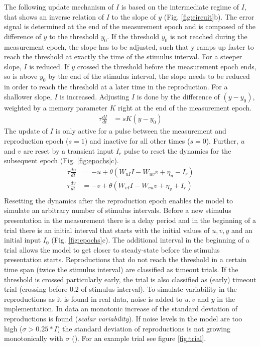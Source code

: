 \documentclass[9pt]{article}
\begin{document}
The following update mechanism of $I$ is based on the intermediate regime of $I$, that shows an inverse relation of $I$ to the slope of $y$ (Fig. \ref{fig:circuit}b).
The error signal is determined at the end of the measurement epoch and is composed of the difference of $y$ to the threshold $y_0$.
If the threshold $y_0$ is not reached during the measurement epoch, the slope has to be adjusted, such that y ramps up faster to reach the threshold at exactly the time of the stimulus interval. For a steeper slope, $I$ is reduced.
If $y$ crossed the threshold before the measurement epoch ends, so is above $y_0$ by the end of the stimulus interval, the slope needs to be reduced in order to reach the threshold at a later time in the reproduction. For a shallower slope, $I$ is increased.
Adjusting $I$ is done by the difference of $(y-y_0)$, weighted by a memory parameter $K$ right at the end of the measurement epoch.
\begin{equation} \label{experimentcircuit}
	\begin{split}
	\tau\frac{dI}{dt} & = sK(y-y_0)
	\end{split}
\end{equation}
The update of $I$ is only active for a pulse between the measurement and reproduction epoch ($s=1$) and inactive for all other times ($s=0$).
Further, $u$ and $v$ are reset by a transient input $I_r$ pulse to reset the dynamics for the subsequent epoch (Fig. \ref{fig:epochs}c).
\begin{equation} \label{experimentcircuit}
	\begin{split}
	\tau\frac{du}{dt} & = -u + \theta(W_{uI}I - W_{uv}v + \eta_u - I_r) \\
	\tau\frac{dv}{dt} & = -v + \theta(W_{vI}I - W_{vu}v + \eta_v + I_r) \\
	\end{split}
\end{equation}
Resetting the dynamics after the reproduction epoch enables the model to simulate an arbitrary number of stimulus intervals. 
Before a new stimulus presentation in the measurement there is a delay period and in the beginning of a trial there is an initial interval that starts with the initial values of $u, v, y$ and an initial input $I_0$ (Fig. \ref{fig:epochs}c). 
The additional interval in the beginning of a trial allows the model to get closer to steady-state before the stimulus presentation starts. 
Reproductions that do not reach the threshold in a certain time span (twice the stimulus interval) are classified as timeout trials. 
If the threshold is crossed particularly early, the trial is also classified as (early) timeout trial (crossing before 0.2 of stimulus interval).
To simulate variability in the reproductions as it is found in real data, noise is added to $u, v$ and $y$ in the implementation. In data an monotonic increase of the standard deviation of reproductions is found (\textit{scalar variability}). 
If noise levels in the model are too high ($\sigma>0.25*I$) the standard deviation of reproductions is not growing monotonically with $\sigma$ (\cite{Egger2020}). 
For an example trial see figure \ref{fig:trial}. 
\end{document}
